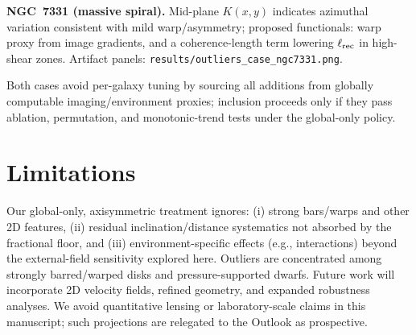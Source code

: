 \documentclass[fleqn,usenatbib]{mnras}
\begin{document}
\noindent \textbf{NGC~7331 (massive spiral).} Mid-plane $K(x,y)$ indicates azimuthal variation consistent with mild warp/asymmetry; proposed functionals: warp proxy from image gradients, and a coherence-length term lowering $\ell_{\rm rec}$ in high-shear zones. Artifact panels: \texttt{results/outliers\_case\_ngc7331.png}.

\noindent Both cases avoid per-galaxy tuning by sourcing all additions from globally computable imaging/environment proxies; inclusion proceeds only if they pass ablation, permutation, and monotonic-trend tests under the global-only policy.

\section{Limitations}
\noindent Our global-only, axisymmetric treatment ignores: (i) strong bars/warps and other 2D features, (ii) residual inclination/distance systematics not absorbed by the fractional floor, and (iii) environment-specific effects (e.g., interactions) beyond the external-field sensitivity explored here. Outliers are concentrated among strongly barred/warped disks and pressure-supported dwarfs. Future work will incorporate 2D velocity fields, refined geometry, and expanded robustness analyses. We avoid quantitative lensing or laboratory-scale claims in this manuscript; such projections are relegated to the Outlook as prospective.

\medskip
\noindent{}
\end{document}
